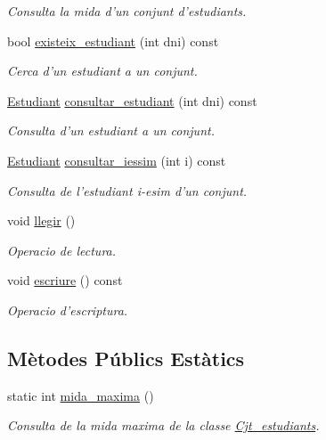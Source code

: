 \begin{DoxyCompactItemize}
\begin{DoxyCompactList}\small\item\em Consulta la mida d'un conjunt d'estudiants. \end{DoxyCompactList}\item 
bool \hyperlink{class_cjt__estudiants_ada47d1e52a6910bb0b1ce21090f8c855}{existeix\+\_\+estudiant} (int dni) const 
\begin{DoxyCompactList}\small\item\em Cerca d'un estudiant a un conjunt. \end{DoxyCompactList}\item 
\hyperlink{class_estudiant}{Estudiant} \hyperlink{class_cjt__estudiants_a90a7bb740b5b14c1038cdfe4b3468674}{consultar\+\_\+estudiant} (int dni) const 
\begin{DoxyCompactList}\small\item\em Consulta d'un estudiant a un conjunt. \end{DoxyCompactList}\item 
\hyperlink{class_estudiant}{Estudiant} \hyperlink{class_cjt__estudiants_a1c598f56d048d036df3ba0afd6fc5ea9}{consultar\+\_\+iessim} (int i) const 
\begin{DoxyCompactList}\small\item\em Consulta de l'estudiant i-\/esim d'un conjunt. \end{DoxyCompactList}\item 
void \hyperlink{class_cjt__estudiants_aa24c2d4c36167b2b810ab459435b67a8}{llegir} ()
\begin{DoxyCompactList}\small\item\em Operacio de lectura. \end{DoxyCompactList}\item 
void \hyperlink{class_cjt__estudiants_a80ca07a3078ae102740a1f1a152ed0a1}{escriure} () const 
\begin{DoxyCompactList}\small\item\em Operacio d'escriptura. \end{DoxyCompactList}\end{DoxyCompactItemize}
\subsection*{Mètodes Públics Estàtics}
\begin{DoxyCompactItemize}
\item 
static int \hyperlink{class_cjt__estudiants_a171fdff58b408ccbf647ab594b5eafa4}{mida\+\_\+maxima} ()
\begin{DoxyCompactList}\small\item\em Consulta de la mida maxima de la classe \hyperlink{class_cjt__estudiants}{Cjt\+\_\+estudiants}. \end{DoxyCompactList}\end{DoxyCompactItemize}



